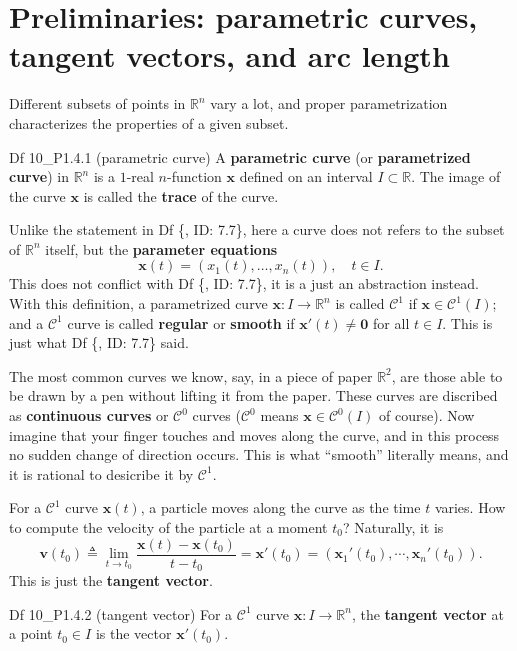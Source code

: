 \documentclass{article}
\begin{document}
\section{Preliminaries: parametric curves, tangent vectors, and arc length}
Different subsets of points in $\mathbb{R}^n$ vary a lot, and proper parametrization characterizes the properties of a given subset. 

\begin{Df}{Df 10\_P1.4.1 (parametric curve)}
    A \textbf{parametric curve} (or \textbf{parametrized curve}) in $\mathbb{R}^n$ is a $1$-real $n$-function $\pmb{x}$ defined on an interval $I\subset \mathbb{R}$. The image of the curve $\pmb{x}$ is called the \textbf{trace} of the curve.
\end{Df}

Unlike the statement in Df \{, ID: 7.7\}, here a curve does not refers to the subset of $\mathbb{R}^n$ itself, but the \textbf{parameter equations} 
$$ \pmb{x}(t) = (x_1(t), \dots, x_n(t)), \quad t\in I. $$
This does not conflict with Df \{, ID: 7.7\}, it is a just an abstraction instead. With this definition, a parametrized curve $\pmb{x}: I\rightarrow \mathbb{R}^n$ is called $\mathcal{C}^1$ if $\pmb{x}\in \mathcal{C}^1(I)$; and a $\mathcal{C}^1$ curve is called \textbf{regular} or \textbf{smooth} if $\pmb{x}'(t)\neq \pmb{0}$ for all $t\in I$. This is just what Df \{, ID: 7.7\} said.

The most common curves we know, say, in a piece of paper $\mathbb{R}^2$, are those able to be drawn by a pen without lifting it from the paper. \textcolor{Df}{These curves are discribed as \textbf{continuous curves} or $\mathcal{C}^{0}$ curves ($\mathcal{C}^0$ means $\pmb{x}\in \mathcal{C}^0(I)$ of course)}. Now imagine that your finger touches and moves along the curve, and in this process no sudden change of direction occurs. This is what ``smooth'' literally means, and it is rational to desicribe it by $\mathcal{C}^1$. 

For a $\mathcal{C}^1$ curve $\pmb{x}(t)$, a particle moves along the curve as the time $t$ varies. How to compute the velocity of the particle at a moment $t_0$? Naturally, it is
$$ \pmb{v}(t_0) \triangleq \lim_{t\rightarrow t_0} \frac{\pmb{x}(t) - \pmb{x}(t_0)}{t-t_0} = \pmb{x}'(t_0) = (\pmb{x}_1'(t_0), \cdots, \pmb{x}_n'(t_0)). $$
This is just the \textbf{tangent vector}.

\begin{Df}{Df 10\_P1.4.2 (tangent vector)}
    For a $\mathcal{C}^1$ curve $\pmb{x}: I\rightarrow \mathbb{R}^n$, the \textbf{tangent vector} at a point $t_0\in I$ is the vector $\pmb{x}'(t_0)$.
\end{Df}
\end{document}
